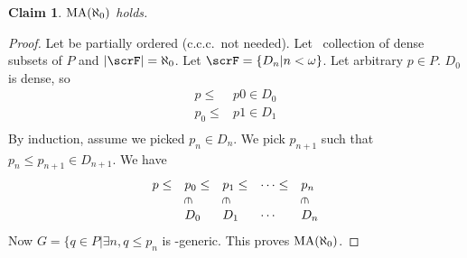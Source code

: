 \documentclass[11pt,pdftex,twoside,a4paper]{article}
\newcommand{\MA}{\ensuremath{\mathop{\rm MA}\nolimits}}
\newcommand{\ccc}{c.c.c.}
\newcommand{\crotin}{\rotatebox[origin=c]{-90}{\(\in\)}}
\newtheorem{claim}[thm]{Claim}
\begin{document}
\begin{claim}
\(\MA(\aleph_0)\) holds.
\end{claim}
\begin{proof}
Let  be partially ordered (\ccc\ not needed).
Let \scrF\ collection of dense subsets of $P$
and \(|\scrF| = \aleph_0\). Let \(\scrF = \{D_n| n < \omega\}\).
Let arbitrary \(p\in P\).  \(D_0\) is dense, so 
\begin{align*}
p \leq & p0 \in D_0 \\
p_0 \leq & p1 \in D_1 \\
\end{align*}
By induction, assume we picked \(p_n \in D_n\).
We pick \(p_{n+1}\) such that \(p_n \leq p_{n+1} \in D_{n+1}\).
We have 
\begin{equation*}
\begin{array}{lllll}
p \leq & p_0 \leq & p_1 \leq &\cdots \leq & p_n \\
       &\crotin   &\crotin   &            & \crotin \\
       & D_0      & D_1      &\cdots      & D_n
\end{array}
\end{equation*}
Now \(G = \{q \in P |\exists n, q \leq p_n\) is \scrF-generic.
This proves \(\MA(\aleph_0)\).
\end{proof}
\end{document}
